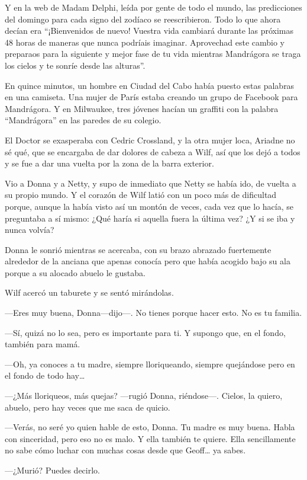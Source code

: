 Y en la web de Madam Delphi, leída por gente de todo el mundo, las
predicciones del domingo para cada signo del zodíaco se reescribieron.
Todo lo que ahora decían era ``¡Bienvenidos de nuevo! Vuestra vida
cambiará durante las próximas 48 horas de maneras que nunca podríais
imaginar. Aprovechad este cambio y preparaos para la siguiente y mejor
fase de tu vida mientras Mandrágora se traga los cielos y te sonríe
desde las alturas''.

En quince minutos, un hombre en Ciudad del Cabo había puesto estas
palabras en una camiseta. Una mujer de París estaba creando un grupo de
Facebook para Mandrágora. Y en Milwaukee, tres jóvenes hacían un
graffiti con la palabra ``Mandrágora'' en las paredes de su colegio.

El Doctor se exasperaba con Cedric Crossland, y la otra mujer loca,
Ariadne no sé qué, que se encargaba de dar dolores de cabeza a Wilf, así
que los dejó a todos y se fue a dar una vuelta por la zona de la barra
exterior.

Vio a Donna y a Netty, y supo de inmediato que Netty se había ido, de
vuelta a su propio mundo. Y el corazón de Wilf latió con un poco más de
dificultad porque, aunque la había visto así un montón de veces, cada
vez que lo hacía, se preguntaba a sí mismo: ¿Qué haría si aquella fuera
la última vez? ¿Y si se iba y nunca volvía?

Donna le sonrió mientras se acercaba, con su brazo abrazado fuertemente
alrededor de la anciana que apenas conocía pero que había acogido bajo
su ala porque a su alocado abuelo le gustaba.

Wilf acercó un taburete y se sentó mirándolas.

---Eres muy buena, Donna---dijo---. No tienes porque hacer esto. No es
tu familia.

---Sí, quizá no lo sea, pero es importante para ti. Y supongo que, en el
fondo, también para mamá.

---Oh, ya conoces a tu madre, siempre lloriqueando, siempre quejándose
pero en el fondo de todo hay\ldots{}

---¿Más lloriqueos, más quejas? ---rugió Donna, riéndose---. Cielos, la
quiero, abuelo, pero hay veces que me saca de quicio.

---Verás, no seré yo quien hable de esto, Donna. Tu madre es muy buena.
Habla con sinceridad, pero eso no es malo. Y ella también te quiere.
Ella sencillamente no sabe cómo luchar con muchas cosas desde que
Geoff\ldots{} ya sabes.

---¿Murió? Puedes decirlo.

